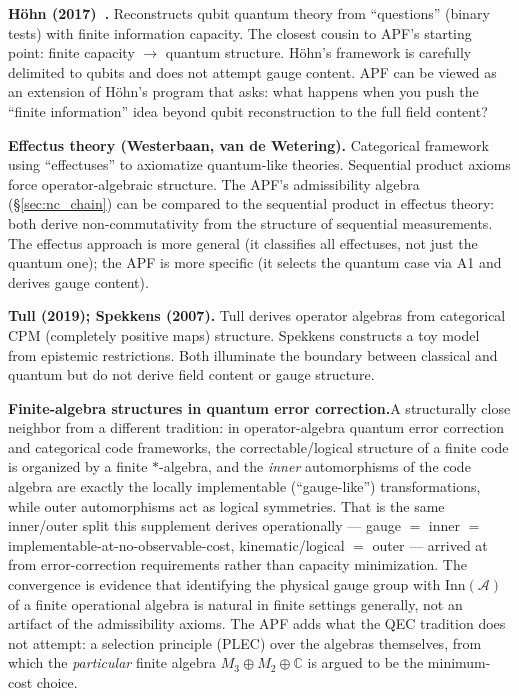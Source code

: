 \documentclass[11pt]{article}
\theoremstyle{definition}
\begin{document}
\smallskip\noindent\textbf{H\"ohn (2017)~\cite{Hohn2017}.}\quad
Reconstructs qubit quantum theory from ``questions'' (binary tests)
with finite information capacity.  The closest cousin to APF's
starting point: finite capacity $\to$ quantum structure.  H\"ohn's
framework is carefully delimited to qubits and does not attempt gauge
content.  APF can be viewed as an extension of H\"ohn's program that
asks: what happens when you push the ``finite information'' idea beyond
qubit reconstruction to the full field content?

\smallskip\noindent\textbf{Effectus theory (Westerbaan, van de Wetering).}\quad
Categorical framework using ``effectuses'' to axiomatize quantum-like
theories.  Sequential product axioms force operator-algebraic structure.
The APF's admissibility algebra (\S\ref{sec:nc_chain}) can be compared
to the sequential product in effectus theory: both derive
non-commutativity from the structure of sequential measurements.  The
effectus approach is more general (it classifies all effectuses, not
just the quantum one); the APF is more specific (it selects the
quantum case via A1 and derives gauge content).

\smallskip\noindent\textbf{Tull (2019); Spekkens (2007).}\quad
Tull derives operator algebras from categorical CPM (completely positive
maps) structure.  Spekkens constructs a toy model from epistemic
restrictions.  Both illuminate the boundary between classical and
quantum but do not derive field content or gauge structure.

\smallskip\noindent\textbf{Finite-algebra structures in quantum error
correction.}\quad A structurally close neighbor from a different
tradition: in operator-algebra quantum error correction and categorical
code frameworks, the correctable/logical structure of a finite code is
organized by a finite $*$-algebra, and the \emph{inner} automorphisms
of the code algebra are exactly the locally implementable
(``gauge-like'') transformations, while outer automorphisms act as
logical symmetries.  That is the same inner/outer split this
supplement derives operationally --- gauge $=$ inner $=$
implementable-at-no-observable-cost, kinematic/logical $=$ outer ---
arrived at from error-correction requirements rather than capacity
minimization.  The convergence is evidence that identifying the
physical gauge group with $\mathrm{Inn}(\mathcal{A})$ of a finite
operational algebra is natural in finite settings generally, not an
artifact of the admissibility axioms.  The APF adds what the QEC
tradition does not attempt: a selection principle (PLEC) over the
algebras themselves, from which the \emph{particular} finite algebra
$M_3 \oplus M_2 \oplus \mathbb{C}$ is argued to be the minimum-cost
choice.
\end{document}
